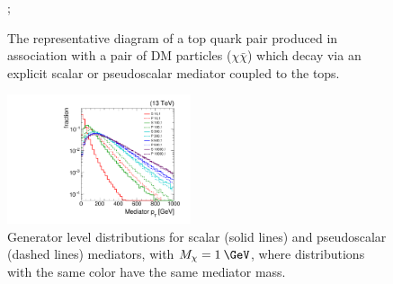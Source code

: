 \begin{figure}
  \begin{center}
    ;
    \caption{The representative diagram of a top quark pair produced in association with a pair of DM particles ($\chi\bar{\chi}$) which decay via an explicit scalar or pseudoscalar mediator coupled to the tops.}
    \label{fig:ttDM}
  \end{center}
\end{figure}

\begin{figure}[htbp!]
  \begin{center}
    \includegraphics[width=0.48\textwidth]{figs/medptlog.pdf}
    \caption{Generator level \pt distributions for scalar (solid lines) and pseudoscalar (dashed lines) mediators, with $M_\chi=1\:\GeV$, where distributions with the same color have the same mediator mass.}
    \label{fig:SvPSmedpt}
  \end{center}
\end{figure}

